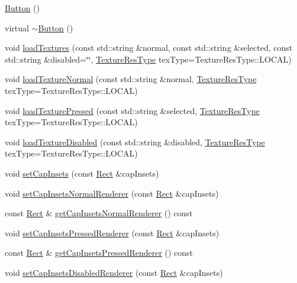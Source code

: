 \begin{DoxyCompactItemize}
\item 
\hyperlink{classui_1_1Button_ae9560ffb17a1d5ca8d671a3d1b869524}{Button} ()
\item 
virtual \hyperlink{classui_1_1Button_ace2bce77b16cf5eaf5abd56ad322432c}{$\sim$\+Button} ()
\item 
void \hyperlink{classui_1_1Button_aa212a77b8ec482b8533d63701bf7267b}{load\+Textures} (const std\+::string \&normal, const std\+::string \&selected, const std\+::string \&disabled=\char`\"{}\char`\"{}, \hyperlink{classui_1_1Widget_a040a65ec5ad3b11119b7e16b98bd9af0}{Texture\+Res\+Type} tex\+Type=Texture\+Res\+Type\+::\+L\+O\+C\+AL)
\item 
void \hyperlink{classui_1_1Button_a2714b3c9a7ec3f7bf89aef9beb491158}{load\+Texture\+Normal} (const std\+::string \&normal, \hyperlink{classui_1_1Widget_a040a65ec5ad3b11119b7e16b98bd9af0}{Texture\+Res\+Type} tex\+Type=Texture\+Res\+Type\+::\+L\+O\+C\+AL)
\item 
void \hyperlink{classui_1_1Button_afe8edbced5e469eae002fbb813b8d924}{load\+Texture\+Pressed} (const std\+::string \&selected, \hyperlink{classui_1_1Widget_a040a65ec5ad3b11119b7e16b98bd9af0}{Texture\+Res\+Type} tex\+Type=Texture\+Res\+Type\+::\+L\+O\+C\+AL)
\item 
void \hyperlink{classui_1_1Button_af2dce2aa5d654addd44311d9c5180767}{load\+Texture\+Disabled} (const std\+::string \&disabled, \hyperlink{classui_1_1Widget_a040a65ec5ad3b11119b7e16b98bd9af0}{Texture\+Res\+Type} tex\+Type=Texture\+Res\+Type\+::\+L\+O\+C\+AL)
\item 
void \hyperlink{classui_1_1Button_a204803affb01c2f8b76d6c2eb8d79437}{set\+Cap\+Insets} (const \hyperlink{classRect}{Rect} \&cap\+Insets)
\item 
void \hyperlink{classui_1_1Button_a0ff8b92e2542a1012b2bebe838b4c69e}{set\+Cap\+Insets\+Normal\+Renderer} (const \hyperlink{classRect}{Rect} \&cap\+Insets)
\item 
const \hyperlink{classRect}{Rect} \& \hyperlink{classui_1_1Button_a45635a18ba15f18b0e0ca8b92eef5904}{get\+Cap\+Insets\+Normal\+Renderer} () const
\item 
void \hyperlink{classui_1_1Button_a2f8aec68ac1b0384653177b0de484bc3}{set\+Cap\+Insets\+Pressed\+Renderer} (const \hyperlink{classRect}{Rect} \&cap\+Insets)
\item 
const \hyperlink{classRect}{Rect} \& \hyperlink{classui_1_1Button_a4b560554c520e4fcbef09274532686c7}{get\+Cap\+Insets\+Pressed\+Renderer} () const
\item 
void \hyperlink{classui_1_1Button_ae63d7927037aa4cac87e07d526c0bbfe}{set\+Cap\+Insets\+Disabled\+Renderer} (const \hyperlink{classRect}{Rect} \&cap\+Insets)

\end{DoxyCompactItemize}

